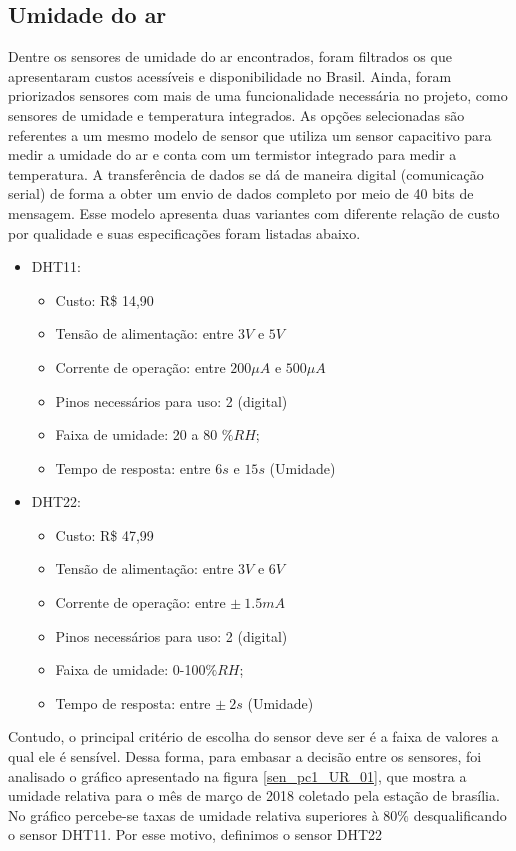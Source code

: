 	\subsection{Umidade do ar}

	Dentre os sensores de umidade do ar encontrados, foram filtrados os que apresentaram custos acessíveis e disponibilidade no Brasil. Ainda, foram priorizados sensores com mais de uma funcionalidade necessária no projeto, como sensores de umidade e temperatura integrados. As opções selecionadas são referentes a um mesmo modelo de sensor que utiliza um sensor capacitivo para medir a umidade do ar e conta com um termistor integrado para medir a temperatura. A transferência de dados se dá de maneira digital (comunicação serial) de forma a obter um envio de dados completo por meio de 40 bits de mensagem. Esse modelo apresenta duas variantes com diferente relação de custo por qualidade e suas especificações foram listadas abaixo.
		
		\begin{itemize}
			\item  DHT11: 
			\begin{itemize}
				\item Custo: R\$ 14,90 
				\item Tensão de alimentação: entre $3V$ e $5V$
				\item Corrente de operação: entre $200\mu A$ e $500\mu A$
				\item Pinos necessários para uso: 2 (digital)
				\item Faixa de umidade: 20 a 80 $ \%RH$;
				\item Tempo de resposta: entre $6s$ e $15s$ (Umidade)
			\end{itemize}
			\item DHT22:
		    \begin{itemize}
				\item Custo: R\$ 47,99 
				\item Tensão de alimentação: entre $3V$ e $6V$
				\item Corrente de operação: entre $\pm~1.5mA$
				\item Pinos necessários para uso: 2 (digital)
				\item Faixa de umidade: 0-100$ \%RH$;
				\item Tempo de resposta: entre  $\pm~2s$ (Umidade)
			\end{itemize}
		\end{itemize}

	Contudo, o principal critério de escolha do sensor deve ser é a faixa de valores a qual ele é sensível. Dessa forma, para embasar a decisão entre os sensores, foi analisado o gráfico apresentado na figura \ref{sen_pc1_UR_01}, que mostra a umidade relativa para o mês de março de 2018 coletado pela estação de brasília. No gráfico percebe-se taxas de umidade relativa superiores à $80\%$ desqualificando o sensor DHT11. Por esse motivo, definimos o sensor DHT22
	
